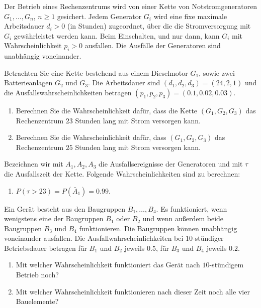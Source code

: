 Der Betrieb eines Rechenzentrums wird von einer Kette von Notstromgeneratoren
$G_1,\dots ,G_n$, $n\geq 1$ gesichert. Jedem Generator $G_i$ wird eine fixe
maximale Arbeitsdauer $d_{i}>0$ (in Stunden) zugeordnet, über die die
Stromversorgung mit $G_i$ gewährleistet werden kann. Beim Einschalten, und nur
dann, kann $G_i$ mit Wahrscheinlichkeit $p_{i}>0$ ausfallen. Die Ausfälle der
Generatoren sind unabhängig voneinander.

Betrachten Sie eine Kette bestehend aus einem Dieselmotor $G_1$,
sowie zwei Batterieanlagen $G_2$ und $G_3$. Die Arbeitsdauer sind
$\left( d_1, d_2, d_3 \right) = \left( 24, 2, 1 \right)$ und die
Ausfallswahrscheinlichkeiten betragen $\left( p_{1}, p_{2}, p_{3}
\right) = \left( 0.1, 0.02, 0.03 \right)$.

\begin{enumerate}
    \item Berechnen Sie die Wahrscheinlichkeit dafür, dass die Kette
        $\left( G_1, G_2, G_3 \right)$ das Rechenzentrum $23$ Stunden lang
        mit Strom versorgen kann.

    \item Berechnen Sie die Wahrscheinlichkeit dafür, dass $\left( G_1, G_2,
        G_3 \right)$ das Rechenzentrum $25$ Stunden lang mit Strom versorgen
        kann.
\end{enumerate}

\solution
Bezeichnen wir mit $A_1, A_2, A_3$ die Ausfallsereignisse der Generatoren
und mit $\tau$ die Ausfallszeit der Kette. Folgende Wahrscheinlichkeiten
sind zu berechnen:
\begin{enumerate}
    \item $P\left( \tau>23 \right) = P( \bar A_1 ) = 0.99$.
\end{enumerate}

 Ein Gerät besteht aus den Baugruppen $B_1,\dots
,B_4$. Es funktioniert, wenn wenigstens eine der Baugruppen $B_1$ oder $B_2$
und wenn außerdem beide Baugruppen $B_3$ und $B_4$ funktionieren. Die
Baugruppen können unabhängig voneinander ausfallen. Die
Ausfallwahrscheinlichkeiten bei $10$-stündiger Betriebsdauer betragen für $B_1$
und $B_2$ jeweils $0.5$, für $B_3$ und $B_4$ jeweils $0.2$. 
\begin{enumerate}
    \item Mit welcher Wahrscheinlichkeit funktioniert das Gerät nach
        $10$-stündigem Betrieb noch?
    \item Mit welcher Wahrscheinlichkeit funktionieren nach dieser Zeit noch
        alle vier Bauelemente?
\end{enumerate}


